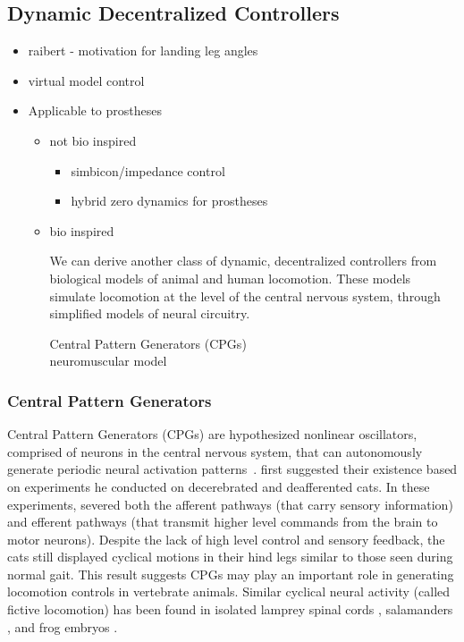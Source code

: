 \subsection{Dynamic Decentralized Controllers}
    \begin{itemize}
        \item raibert - motivation for landing leg angles
        \item virtual model control

        \item Applicable to prostheses
        \begin{itemize}
            \item not bio inspired
                \begin{itemize}
                    \item simbicon/impedance control
                    \item hybrid zero dynamics for prostheses
                \end{itemize}

            \item bio inspired

                We can derive another class of dynamic, decentralized
                controllers from biological models of animal and human
                locomotion. These models simulate locomotion at the level of the
                central nervous system, through simplified models of neural
                circuitry. 
                \begin{description}
                    \item[Central Pattern Generators (CPGs)]
                        
                    \item[neuromuscular model] 
                \end{description}
        \end{itemize}
   \end{itemize}

\subsubsection{Central Pattern Generators}
Central Pattern Generators (CPGs) are hypothesized nonlinear
oscillators, comprised of neurons in the central nervous system, that can
autonomously generate periodic neural activation
patterns~\citep{ijspeert2008central}.  \citet{brown1911intrinsic} first
suggested their existence based on experiments he conducted on decerebrated and
deafferented cats. In these experiments, \citeauthor{brown1911intrinsic} severed
both the afferent pathways (that carry sensory information) and efferent
pathways (that transmit higher level commands from the brain to motor neurons).
Despite the lack of high level control and sensory feedback, the cats still
displayed cyclical motions in their hind legs similar to those seen during
normal gait. This result suggests CPGs may play an important role in generating
locomotion controls in vertebrate animals. Similar cyclical neural activity
(called fictive locomotion) has been found in isolated lamprey spinal cords
\citep{cohen1980neuronal}, salamanders \citep{delvolve1999fictive}, and frog
embryos \citep{soffe1982tonic}. 

